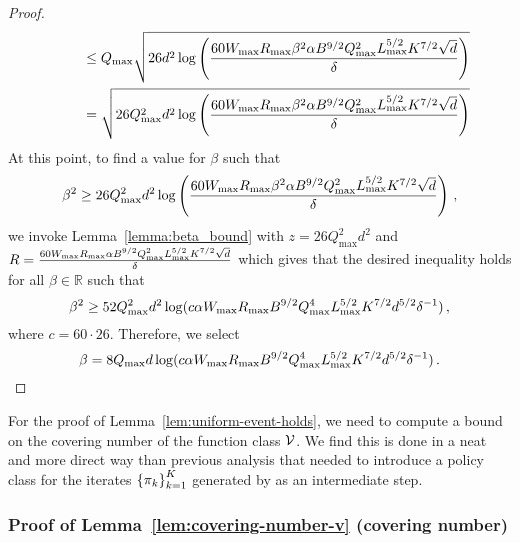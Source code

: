 \begin{proof}
\begin{align*}
        &~~~~~~~\leq Q_{\max} \sqrt{26 d^2 \log \left({\frac{60 W_{\max} R_{\max} \beta^2 \alpha B^{9/2} Q^2_{\max}L^{5/2}_{\max}K^{7/2}\sqrt{d}}{\delta}}\right)} \\ 
        &~~~~~~~ = \sqrt{26 Q^2_{\max} d^2 \log \left({\frac{60 W_{\max} R_{\max} \beta^2 \alpha  B^{9/2} Q^2_{\max}L^{5/2}_{\max}K^{7/2}\sqrt{d}}{\delta}}\right)} \\
    \end{align*}
    At this point, to find a value for $\beta$ such that
    \begin{equation*}
        \beta^2 \geq 26 Q^2_{\max} d^2 \log \left({\frac{60 W_{\max} R_{\max} \beta^2 \alpha B^{9/2} Q^2_{\max}L^{5/2}_{\max}K^{7/2}\sqrt{d}}{\delta}}\right)\,,
    \end{equation*}
    we invoke Lemma~\ref{lemma:beta_bound} with $z = 26 Q^2_{\max} d^2$ and $R = \frac{60 W_{\max} R_{\max} \alpha B^{9/2}Q^2_{\max}L^{5/2}_{\max}K^{7/2}\sqrt{d}}{\delta}$ which gives that the desired inequality holds for all $\beta \in \mathbb{R}$ such that
    \begin{equation*}
        \beta^2 \geq 52 Q^2_{\max} d^2 \log(c \alpha W_{\max} R_{\max} B^{9/2} Q^4_{\max}L^{5/2}_{\max}K^{7/2} d^{5/2} \delta^{-1})\,,
    \end{equation*}
    where $c = 60 \cdot 26$. Therefore, we select
    \begin{equation*}
        \beta = 8 Q_{\max} d \log(c \alpha W_{\max} R_{\max} B^{9/2} Q^4_{\max}L^{5/2}_{\max}K^{7/2} d^{5/2} \delta^{-1})\,.
    \end{equation*}
\end{proof}

\begin{remark}
    For the proof of Lemma~\ref{lem:uniform-event-holds}, we need to compute a bound on the covering number of the function class $\mathcal{V}$. We find this is done in a neat and more direct way than previous analysis \cite{zhong2024theoretical,sherman2023rate,cassel2024warmupfree} that needed to introduce a policy class for the iterates $\left\{{\pi_k}\right\}^K_{k=1}$ generated by  as an intermediate step.
\end{remark}


\subsubsection{Proof of Lemma~\ref{lem:covering-number-v} (covering number)}
\label{app:covering-number-v}

